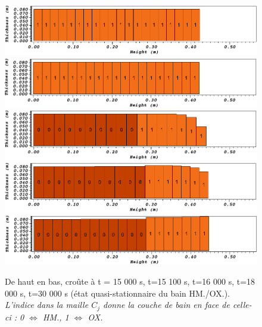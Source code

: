 \begin{figure}[H]
\centering
\includegraphics[width=\textwidth, keepaspectratio=true]{Figures/croute_15000.png}\\
\includegraphics[width=\textwidth, keepaspectratio=true]{Figures/croute_15100.png}\\
\includegraphics[width=\textwidth, keepaspectratio=true]{Figures/croute_16000.png}\\
\includegraphics[width=\textwidth, keepaspectratio=true]{Figures/croute_18000.png}\\
\includegraphics[width=\textwidth, keepaspectratio=true]{Figures/croute_30000.png}\\
\caption{De haut en bas, croûte à t = 15 000 s, t=15 100 s, t=16 000 s, t=18 000 s, t=30 000 s (état quasi-stationnaire du bain HM./OX.). \textit{L'indice dans la maille $C_j$ donne la couche de bain en face de celle-ci : 0 $\Leftrightarrow$ HM., 1 $\Leftrightarrow$ OX.}}
\label{fig:croutes_2}
\end{figure}
